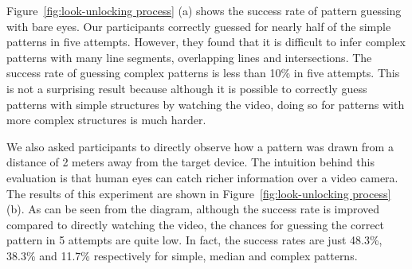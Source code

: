         Figure~\ref{fig:look-unlocking process} (a) shows the success rate of pattern guessing with
        bare eyes. Our participants correctly guessed for nearly half of the
        simple patterns in five attempts. However, they found that it is difficult
        to infer complex patterns with many line segments, overlapping lines and intersections.
        The success rate of guessing complex patterns is less than 10\% in five attempts.
        This is not a surprising result
        because although it is possible to correctly guess patterns with
        simple structures by watching the video, doing so for patterns with
        more complex structures is much harder.


    We also asked participants to directly observe how a pattern was drawn
    from a distance of 2 meters away from the target device. The intuition
    behind this evaluation is that human eyes can catch richer information
    over a video camera. The results of this experiment are shown in
    Figure~\ref{fig:look-unlocking process} (b).  As can be seen from the
    diagram, although the success rate is improved compared to directly watching the video, the chances for guessing the correct pattern in
    5 attempts are quite low. In
    fact, the success rates are just 48.3\%, 38.3\%
    and 11.7\% respectively for simple, median and complex patterns.

